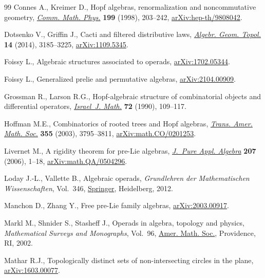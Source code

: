 \documentclass[10pt,a4paper]{amsart}
\numberwithin{equation}{section}
\begin{document}
\begin{thebibliography}{99}
Connes A., Kreimer D., Hopf algebras, renormalization and noncommutative
 geometry, \href{https://doi.org/10.1007/s002200050499}{\textit{Comm. Math. Phys.}} \textbf{199} (1998), 203--242,
 \href{https://arxiv.org/abs/hep-th/9808042}{arXiv:hep-th/9808042}.

Dotsenko V., Griffin J., Cacti and filtered distributive laws, \href{https://doi.org/10.2140/agt.2014.14.3185}{\textit{Algebr.
 Geom. Topol.}} \textbf{14} (2014), 3185--3225, \href{https://arxiv.org/abs/1109.5345}{arXiv:1109.5345}.

Foissy L., Algebraic structures associated to operads, \href{https://arxiv.org/abs/1702.05344}{arXiv:1702.05344}.

Foissy L., Generalized prelie and permutative algebras, \href{https://arxiv.org/abs/2104.00909}{arXiv:2104.00909}.

Grossman R., Larson R.G., Hopf-algebraic structure of combinatorial objects and
 differential operators, \href{https://doi.org/10.1007/BF02764614}{\textit{Israel~J. Math.}} \textbf{72} (1990),
 109--117.

Hoffman M.E., Combinatorics of rooted trees and {H}opf algebras, \href{https://doi.org/10.1090/S0002-9947-03-03317-8}{\textit{Trans.
 Amer. Math. Soc.}} \textbf{355} (2003), 3795--3811, \href{https://arxiv.org/abs/math.CO/0201253}{arXiv:math.CO/0201253}.

Livernet M., A rigidity theorem for pre-{L}ie algebras, \href{https://doi.org/10.1016/j.jpaa.2005.10.014}{\textit{J.~Pure Appl.
 Algebra}} \textbf{207} (2006), 1--18, \href{https://arxiv.org/abs/math.QA/0504296}{arXiv:math.QA/0504296}.

Loday J.-L., Vallette B., Algebraic operads, \textit{Grundlehren der
 Mathematischen Wissenschaften}, Vol.~346, \href{https://doi.org/10.1007/978-3-642-30362-3}{Springer}, Heidelberg, 2012.

Manchon D., Zhang Y., Free pre-{L}ie family algebras, \href{https://arxiv.org/abs/2003.00917}{arXiv:2003.00917}.

Markl M., Shnider S., Stasheff J., Operads in algebra, topology and physics,
 \textit{Mathematical Surveys and Monographs}, Vol.~96, \href{https://doi.org/10.1090/surv/096}{Amer. Math. Soc.},
 Providence, RI, 2002.

Mathar R.J., Topologically distinct sets of non-intersecting circles in the
 plane, \href{https://arxiv.org/abs/1603.00077}{arXiv:1603.00077}.


\end{thebibliography}
\end{document}
